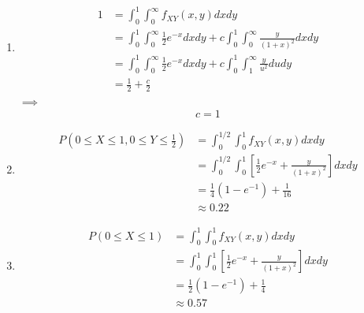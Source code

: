 \begin{problem}{16} $ $
\begin{enumerate}

\item 
\begin{align*}
1 &= \int_0^1 \int_0^\infty f_{XY}(x, y)dx dy \\
& = \int_0^1 \int_0^\infty \frac{1}{2}e^{-x} dx dy+c\int_0^1 \int_0^\infty \frac{y}{(1+x)^2}dx dy \\
& = \int_0^1 \int_0^\infty \frac{1}{2}e^{-x} dx dy+c\int_0^1 \int_1^\infty \frac{y}{u^2}du dy \\
& = \frac{1}{2}+\frac{c}{2}
\end{align*}
$\implies$
\begin{equation*}
c = 1
\end{equation*}


\item 
\begin{align*}
P\left(0 \le X \le 1, 0 \le Y \le \frac{1}{2} \right) &= \int_0^{1/2} \int_0^{1} f_{XY}(x, y)dx dy \\
&= \int_0^{1/2} \int_0^{1} \left [ \frac{1}{2}e^{-x} + \frac{y}{(1+x)^2} \right ]dx dy \\
& = \frac{1}{4}(1-e^{-1})+\frac{1}{16}\\
& \approx 0.22
\end{align*}

\item 
\begin{align*}
P(0 \le X \le 1) &= \int_0^{1} \int_0^{1} f_{XY}(x, y)dx dy \\
&= \int_0^{1} \int_0^{1} \left [ \frac{1}{2}e^{-x} + \frac{y}{(1+x)^2} \right ]dx dy \\
& = \frac{1}{2}(1-e^{-1})+\frac{1}{4}\\
& \approx 0.57
\end{align*}



\end{enumerate}
\end{problem}


